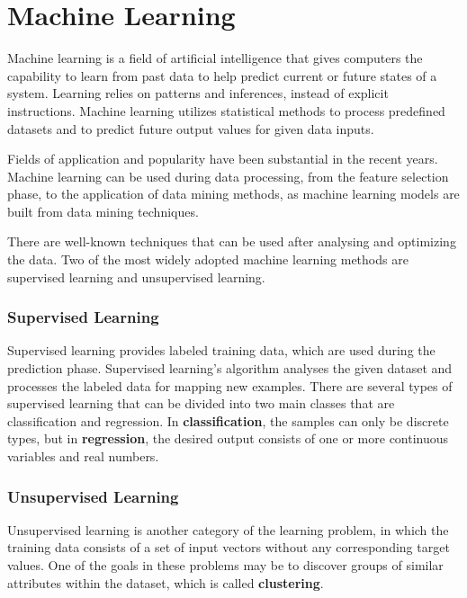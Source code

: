 \section{Machine Learning}

Machine learning \cite{mitchell1997machine, michalski2014machine, alpaydin2009introduction} is a field of artificial intelligence that gives computers the capability to learn from past data to help predict current or future states of a system. Learning relies on patterns and inferences, instead of explicit instructions. Machine learning utilizes statistical methods to process predefined datasets and to predict future output values for given data inputs. \medskip

Fields of application and popularity have been substantial in the recent years. Machine learning can be used during data processing, from the feature selection phase, to the application of data mining methods, as machine learning models are built from data mining techniques.  \medskip

There are well-known techniques that can be used after analysing and optimizing the data. Two of the most widely adopted machine learning methods are supervised learning and unsupervised learning.

\subsubsection{Supervised Learning}

\label{para:supervised}Supervised learning provides labeled training data, which are used during the prediction phase. Supervised learning's algorithm analyses the given dataset and processes the labeled data for mapping new examples. There are several types of supervised learning that can be divided into two main classes that are classification and regression. In \textbf{classification}, the samples can only be discrete types, but in \textbf{regression}, the desired output consists of one or more continuous variables and real numbers.

\subsubsection{Unsupervised Learning}

Unsupervised learning is another category of the learning problem, in which the training data consists of a set of input vectors without any corresponding target values. One of the goals in these problems may be to discover groups of similar attributes within the dataset, which is called \textbf{clustering}.




